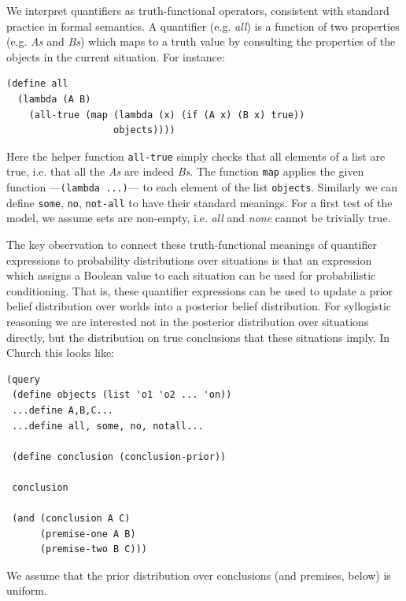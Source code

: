 \documentclass[10pt,letterpaper]{article}
\begin{document}
%
%




We interpret quantifiers as truth-functional operators, consistent with standard practice in formal semantics.
A quantifier (e.g. \emph{all}) is a function of two properties (e.g. \emph{As} and \emph{Bs}) which maps to a truth value by consulting the properties of the objects in the current situation. For instance:
\begin{lstlisting}
(define all 
  (lambda (A B) 
    (all-true (map (lambda (x) (if (A x) (B x) true)) 
                   objects))))
\end{lstlisting}
Here the helper function \lstinline{all-true} simply checks that all elements of a list are true, i.e. that all the \emph{As} are indeed \emph{Bs}. The function \lstinline{map} applies the given function ---\lstinline{(lambda ...)}--- to each element of the list \lstinline{objects}. Similarly we can define \lstinline{some}, \lstinline{no}, \lstinline{not-all} to have their standard meanings. For a first test of the model, we assume sets are non-empty, i.e. \emph{all} and \emph{none} cannot be trivially true.

The key observation to connect these truth-functional meanings of quantifier expressions to probability distributions over situations is that an expression which assigns a Boolean value to each situation can be used for probabilistic conditioning. That is, these quantifier expressions can be used to update a prior belief distribution over worlds into a posterior belief distribution. For syllogistic reasoning we are interested not in the posterior distribution over situations directly, but the distribution on true conclusions that these situations imply. In Church this looks like:
\begin{lstlisting}
(query
 (define objects (list 'o1 'o2 ... 'on))
 ...define A,B,C...
 ...define all, some, no, notall...
 
 (define conclusion (conclusion-prior))
 
 conclusion
 
 (and (conclusion A C) 
      (premise-one A B)
      (premise-two B C)))
\end{lstlisting}
We assume that the prior distribution over conclusions (and premises, below) is uniform.
\end{document}

